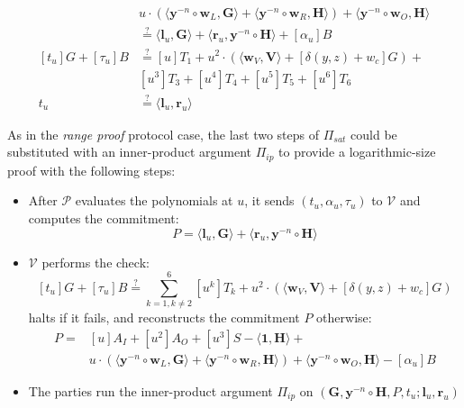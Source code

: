 \documentclass[../../book.tex]{subfiles}
\begin{document}
\begin{definition}
\begin{itemize}
\begin{equation*}
\begin{aligned}
                    &u \cdot (\langle \mathbf{y}^{-n} \circ \mathbf{w}_L, \mathbf{G} \rangle + \langle \mathbf{y}^{-n} \circ \mathbf{w}_R, \mathbf{H} \rangle) + \langle \mathbf{y}^{-n} \circ \mathbf{w}_O, \mathbf{H} \rangle \\
                    &\stackrel{\text{?}}{=} \langle \mathbf{l}_u, \mathbf{G} \rangle + \langle \mathbf{r}_u, \mathbf{y}^{-n} \circ \mathbf{H} \rangle + [\alpha_u]B\\
                    [t_u]G + [\tau_u]B &\stackrel{\text{?}}{=} [u]T_1 + u^2 \cdot (\langle \mathbf{w}_V, \mathbf{V} \rangle + [\delta(y,z) + w_c]G) +\\
                    &[u^3]T_3 + [u^4]T_4 + [u^5]T_5 + [u^6]T_6\\
                    t_u &\stackrel{\text{?}}{=} \langle \mathbf{l}_u, \mathbf{r}_u \rangle
                \end{aligned}
            \end{equation*}
    \end{itemize}
\end{definition}

\begin{remark}
    As in the \textit{range proof} protocol case, the last two steps of $\Pi_{sat}$ could be substituted with an inner-product argument $\Pi_{ip}$ to provide a logarithmic-size proof with the following steps:
    \begin{itemize}
        \item After $\mathcal{P}$ evaluates the polynomials at $u$, it sends $(t_u, \alpha_u, \tau_u)$ to $\mathcal{V}$ and computes the commitment:
        $$P = \langle \mathbf{l}_u, \mathbf{G} \rangle + \langle \mathbf{r}_u, \mathbf{y}^{-n} \circ \mathbf{H} \rangle$$
        \item $\mathcal{V}$ performs the check:
        $$
            [t_u]G + [\tau_u]B \stackrel{\text{?}}{=} \sum_{k=1, k\neq 2}^6 [u^k]T_k + u^2 \cdot (\langle \mathbf{w}_V, \mathbf{V} \rangle + [\delta(y,z) + w_c]G)
        $$
        halts if it fails, and reconstructs the commitment $P$ otherwise:
        \begin{align*}
            P =& [u]A_I + [u^2]A_O + [u^3]S - \langle \mathbf{1}, \mathbf{H} \rangle +\\
                &u \cdot (\langle \mathbf{y}^{-n} \circ \mathbf{w}_L, \mathbf{G} \rangle + \langle \mathbf{y}^{-n} \circ \mathbf{w}_R, \mathbf{H} \rangle) + \langle \mathbf{y}^{-n} \circ \mathbf{w}_O, \mathbf{H} \rangle - [\alpha_u]B
        \end{align*}
        \item The parties run the inner-product argument $\Pi_{ip}$ on $(\mathbf{G},\mathbf{y}^{-n} \circ \mathbf{H}, P, t_u; \mathbf{l}_u, \mathbf{r}_u)$
    \end{itemize}
\end{remark}
\end{document}
